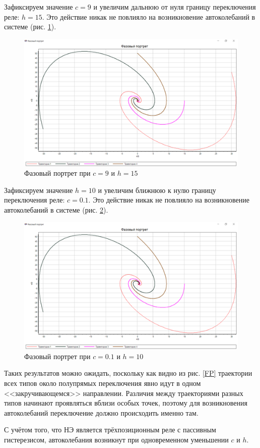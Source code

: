 	Зафиксируем значение $c=9$ и увеличим дальнюю от нуля границу переключения реле: $h=15$. Это действие никак не повлияло на возникновение автоколебаний в системе (рис. \ref{s_lambda2}).
	
	\begin{figure}[h]
		\centering\includegraphics[width=.7\textwidth]{png/FP_lambda2.png}
		\caption{Фазовый портрет при $c=9$ и $h=15$}
		\label{s_lambda2}
	\end{figure}
	
	Зафиксируем значение $h=10$ и увеличим ближнюю к нулю границу переключения реле: $c=0.1$. Это действие никак не повлияло на возникновение автоколебаний в системе (рис. \ref{s_lambda3}).
	
	\begin{figure}[h]
		\centering\includegraphics[width=.7\textwidth]{png/FP_lambda3.png}
		\caption{Фазовый портрет при $c=0.1$ и $h=10$}
		\label{s_lambda3}
	\end{figure}
	
	Таких результатов можно ожидать, поскольку как видно из рис. \ref{FP} траектории всех типов около полупрямых переключения явно идут в одном <<закручивающемся>> направлении. Различия между траекториями разных типов начинают проявляться вблизи особых точек, поэтому для возникновения автоколебаний переключение должно происходить именно там.
	
	С учётом того, что НЭ является трёхпозиционным реле с пассивным гистерезисом, автоколебания возникнут при одновременном уменьшении $c$ и $h$.
	

